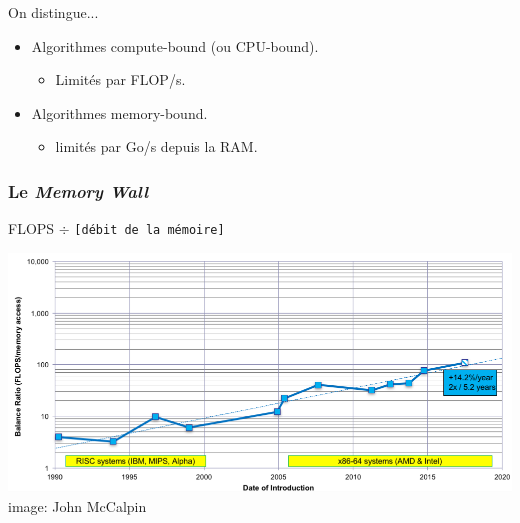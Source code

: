 \documentclass[xcolor={x11names,svgnames}, 14pt]{beamer}
\begin{document}
\begin{frame}
\bigskip

\begin{block}{On distingue...}
\begin{itemize}
\item Algorithmes \alert{compute-bound} {\small (ou CPU-bound)}.
  \begin{itemize}
  \item Limités par FLOP/s.
  \end{itemize}
  \medskip
  
\item Algorithmes \alert{memory-bound}.
  \begin{itemize}
  \item  limités par Go/s depuis la RAM.
  \end{itemize}
\end{itemize}
\end{block}

\end{frame}


\begin{frame}
  \frametitle{Le \og \emph{Memory Wall}\fg{}}

  \begin{center}
    \large FLOPS $\div$ \texttt{[débit de la mémoire]}
  \end{center}

  \bigskip
  
  \includegraphics[width=\textwidth]{calpin_wall_bw.png}
  \flushright image: John McCalpin
\end{frame}

\end{document}
